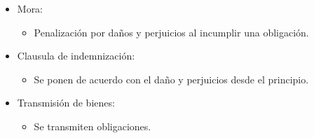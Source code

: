 \begin{enumerate}
\begin{itemize}
            \item Mora:
                \begin{itemize}
                    \item Penalización por daños y perjuicios al incumplir una obligación.
                \end{itemize}
            
            \item Clausula de indemnización: 
                \begin{itemize}
                    \item Se ponen de acuerdo con el daño y perjuicios desde el principio.
                \end{itemize}
            
            \item Transmisión de bienes:
                \begin{itemize}
                    \item Se transmiten obligaciones.
                \end{itemize}
        \end{itemize}
\end{enumerate}
